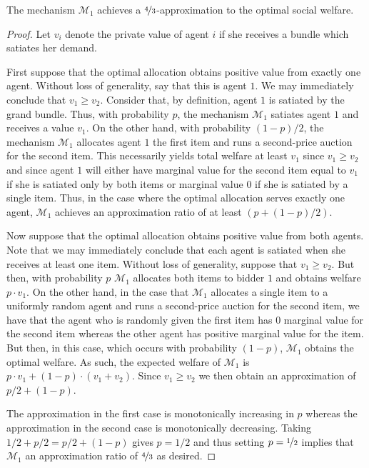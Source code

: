 \begin{claim}
The mechanism $\mathcal{M}_1$ achieves a $\nicefrac 4 3$-approximation to the optimal social welfare.
\end{claim}
\begin{proof}
    Let $v_i$ denote the private value of agent $i$ if she receives a bundle which satiates her demand. 
    
    First suppose that the optimal allocation obtains positive value from exactly one agent.  Without loss of generality, say that this is agent $1$.  We may immediately conclude that $v_1 \geq v_2$.  Consider that, by definition, agent $1$ is satiated by the grand bundle.  Thus, with probability $p$, the mechanism $\mathcal{M}_1$ satiates agent $1$ and receives a value $v_1$.  On the other hand, with probability $(1-p)/2$, the mechanism $\mathcal{M}_1$ allocates agent $1$ the first item and runs a second-price auction for the second item.  This necessarily yields total welfare at least $v_1$ since $v_1 \geq v_2$ and since agent $1$ will either have marginal value for the second item equal to $v_1$ if she is satiated only by both items or marginal value $0$ if she is satiated by a single item.  Thus, in the case where the optimal allocation serves exactly one agent, $\mathcal{M}_1$ achieves an approximation ratio of at least $(p + (1-p)/2)$.

    Now suppose that the optimal allocation obtains positive value from both agents.  Note that we may immediately conclude that each agent is satiated when she receives at least one item.  Without loss of generality, suppose that $v_1 \geq v_2$.  But then, with probability $p$ $\mathcal{M}_1$ allocates both items to bidder $1$ and obtains welfare $p\cdot v_1$.  On the other hand, in the case that $\mathcal{M}_1$ allocates a single item to a uniformly random agent and runs a second-price auction for the second item, we have that the agent who is randomly given the first item has $0$ marginal value for the second item whereas the other agent has positive marginal value for the item.  But then, in this case, which occurs with probability $(1-p)$, $\mathcal{M}_1$ obtains the optimal welfare.  As such, the expected welfare of $\mathcal{M}_1$ is $p \cdot v_1 + (1-p)\cdot (v_1 + v_2)$.  Since $v_1 \geq v_2$ we then obtain an approximation of $p/2 + (1-p)$.

    The approximation in the first case is monotonically increasing in $p$ whereas the approximation in the second case is monotonically decreasing.  Taking $1/2 + p/2 = p/2 + (1-p)$ gives $p = 1/2$ and thus setting $p=\nicefrac{1}{2}$ implies that $\mathcal M_1$ an approximation ratio of $\nicefrac 4 3$ as desired.
\end{proof}



